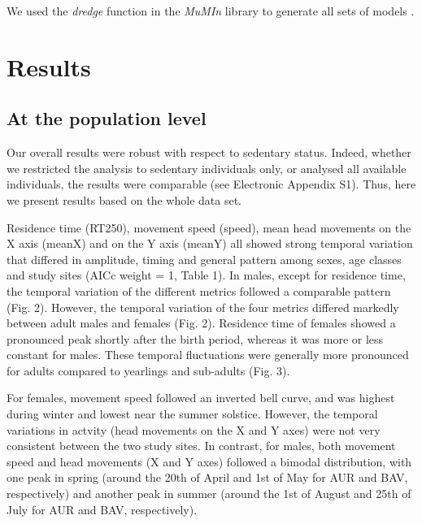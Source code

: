 \documentclass[a4paper,11pt]{article}
\begin{document}
We used the \textit{dredge} function in the \textit{MuMIn} library to
generate all sets of models \citep{barton_mumin:_2016}.

\section*{Results}
\subsection*{At the population level}

Our overall results were robust with respect to sedentary
status. Indeed, whether we restricted the analysis to sedentary
individuals only, or analysed all available individuals, the results
were comparable (see Electronic Appendix S1). Thus, here we present
results based on the whole data set.

Residence time (RT250), movement speed (speed), mean head movements on
the X axis (meanX) and on the Y axis (meanY) all showed strong
temporal variation that differed in amplitude, timing and general
pattern among sexes, age classes and study sites (AICc weight = 1,
Table 1). In males, except for residence time, the temporal variation
of the different metrics followed a comparable pattern
(Fig. 2). However, the temporal variation of the four metrics differed
markedly between adult males and females (Fig. 2). Residence time of
females showed a pronounced peak shortly after the birth period,
whereas it was more or less constant for males. These temporal
fluctuations were generally more pronounced for adults compared to
yearlings and sub-adults (Fig. 3).

For females, movement speed followed an inverted bell curve, and was
highest during winter and lowest near the summer solstice. However,
the temporal variations in actvity (head movements on the X and Y
axes) were not very consistent between the two study sites. In
contrast, for males, both movement speed and head movements (X and Y
axes) followed a bimodal distribution, with one peak in spring (around
the 20th of April and 1st of May for AUR and BAV, respectively) and
another peak in summer (around the 1st of August and 25th of July for
AUR and BAV, respectively).
\end{document}
